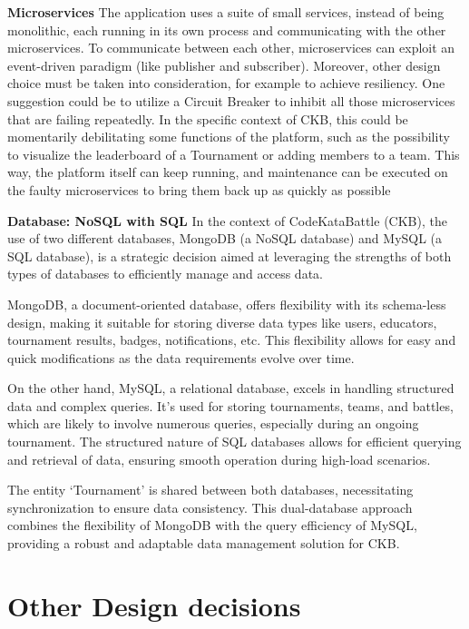 \textbf{Microservices}
The application uses a suite of small services, instead of being monolithic, 
each running in its own process and communicating with the other microservices. 
To communicate between each other, microservices can exploit an event-driven paradigm (like publisher and subscriber). 
Moreover, other design choice must be taken into consideration, for example to achieve resiliency. 
One suggestion could be to utilize a Circuit Breaker to inhibit all those microservices that are failing repeatedly. 
In the specific context of CKB, this could be momentarily debilitating some functions of the platform, 
such as the possibility to visualize the leaderboard of a Tournament or adding members to a team. 
This way, the platform itself can keep running, and maintenance can be executed on the faulty microservices to bring them back up as quickly as possible

\textbf{Database: NoSQL with SQL}
In the context of CodeKataBattle (CKB), the use of two different databases, MongoDB (a NoSQL database) and MySQL (a SQL database), 
is a strategic decision aimed at leveraging the strengths of both types of databases to efficiently manage and access data.

MongoDB, a document-oriented database, offers flexibility with its schema-less design, 
making it suitable for storing diverse data types like users, educators, tournament results, badges, notifications, etc. 
This flexibility allows for easy and quick modifications as the data requirements evolve over time.

On the other hand, MySQL, a relational database, 
excels in handling structured data and complex queries. 
It’s used for storing tournaments, teams, and battles, which are likely to involve numerous queries, 
especially during an ongoing tournament. The structured nature of SQL databases allows for efficient querying and retrieval of data, 
ensuring smooth operation during high-load scenarios.

The entity ‘Tournament’ is shared between both databases, 
necessitating synchronization to ensure data consistency. 
This dual-database approach combines the flexibility of MongoDB with the query efficiency of MySQL, 
providing a robust and adaptable data management solution for CKB.

\section{Other Design decisions}

